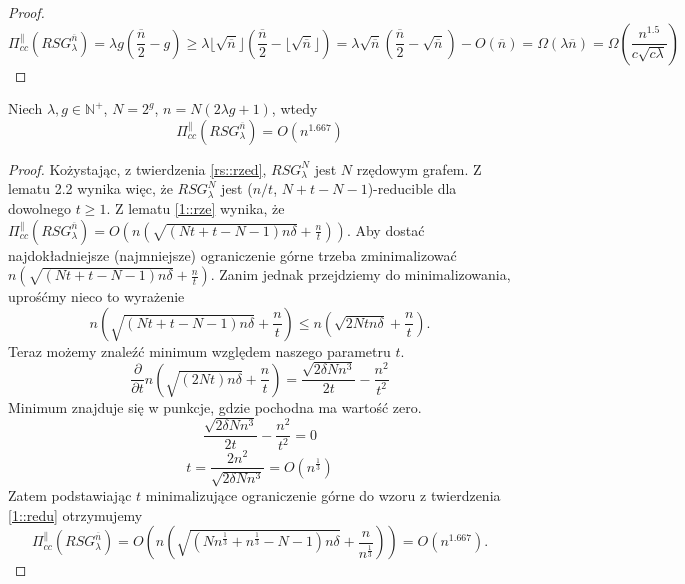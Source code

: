 \begin{proof}
	$$ \Pi_{cc}^{ \parallel }(RSG_{\lambda}^{\overline{n}}) = \lambda g \left( \frac{ \overline{n}}{2} - g \right) \geq \lambda \lfloor \sqrt{ \overline{n}} \rfloor \left( \frac{ \overline{n}}{2} - \lfloor \sqrt{ \overline{n}} \rfloor \right) = \lambda \sqrt{ \overline{n}} \left( \frac{ \overline{n}}{2} - \sqrt{ \overline{n}} \right) - O(\overline{n}) =  \Omega \left( \lambda \overline{n} \right) = \Omega \left( \frac{n^{1.5}}{c \sqrt{c \lambda}} \right) $$
	
\end{proof}



\begin{theorem}
	Niech $\lambda, g \in \mathbb{N}^{+}$, $N = 2^{g}$, $n = N(2 \lambda g + 1)$, wtedy
	$$ \Pi_{cc}^{ \parallel }(RSG_{\lambda}^{\overline{n}}) = O \left( n^{1.667} \right) $$
\end{theorem}

\begin{proof}
	Kożystając, z twierdzenia \ref{rs::rzed}, $RSG_{\lambda}^{N}$ jest $N$ rzędowym grafem.
	Z lematu 2.2 wynika więc, że $RSG_{\lambda}^{N}$  jest ($n / t$, $N + t - N - 1$)-reducible dla dowolnego $t \geq 1$.
	Z lematu \ref{1::rze} wynika, że $\Pi_{cc}^{ \parallel }(RSG_{\lambda}^{\overline{n}}) = O \left( n \left( \sqrt{( N t + t - N - 1)n \delta } + \frac{n}{t} \right) \right)$.
	Aby dostać najdokładniejsze (najmniejsze) ograniczenie górne trzeba zminimalizować
	$n \left( \sqrt{( N t + t - N - 1)n \delta } + \frac{n}{t} \right)$.
	Zanim jednak przejdziemy do minimalizowania, uprośćmy nieco to wyrażenie
	$$ n \left( \sqrt{( N t + t - N - 1)n \delta } + \frac{n}{t} \right) \leq n \left( \sqrt{ 2N t n \delta } + \frac{n}{t} \right) .$$
	Teraz możemy znaleźć minimum względem naszego parametru $t$.
	$$ \frac{\partial}{\partial t} n \left( \sqrt{( 2N t)n \delta } + \frac{n}{t} \right) = \frac{ \sqrt{ 2 \delta N n^{3} }}{2t} - \frac{n^{2}}{t^{2}}$$
	Minimum znajduje się w punkcje, gdzie pochodna ma wartość zero.
	$$ \frac{ \sqrt{ 2 \delta N n^{3} }}{2t} - \frac{n^{2}}{t^{2}} = 0$$
	$$ t = \frac{2n^{2}}{ \sqrt{ 2 \delta N n^{3} }} = O \left( n^{\frac{1}{3}} \right) $$
	Zatem podstawiając $t$ minimalizujące ograniczenie górne do wzoru z twierdzenia \ref{1::redu} otrzymujemy
	$$ \Pi_{cc}^{ \parallel }(RSG_{\lambda}^{\overline{n}}) = O \left( n \left( \sqrt{( N n^{\frac{1}{3}} + n^{\frac{1}{3}} - N - 1)n \delta } + \frac{n}{n^{\frac{1}{3}}} \right) \right) = O \left( n^{1.667} \right). $$
\end{proof}










